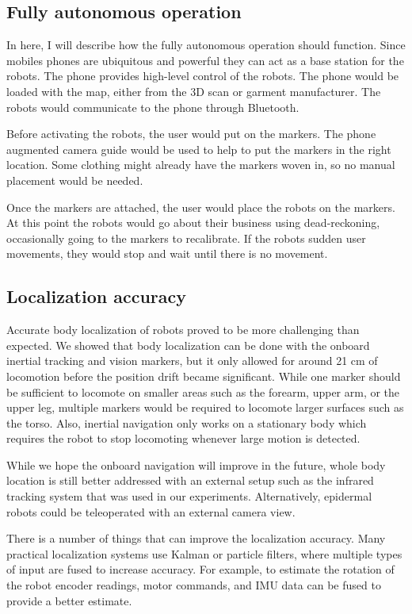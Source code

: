 \subsection{Fully autonomous operation}
In here, I will describe how the fully autonomous operation should function. 
Since mobiles phones are ubiquitous and powerful they can act as a base station for the robots. The phone provides high-level control of the robots. The phone would be loaded with the map, either from the 3D scan or garment manufacturer.  The robots would communicate to the phone through Bluetooth. 

Before activating the robots, the user would put on the markers. The phone augmented camera guide would be used to help to put the markers in the right location. Some clothing might already have the markers woven in, so no manual placement would be needed. 

Once the markers are attached, the user would place the robots on the markers. At this point the robots would go about their business using dead-reckoning, occasionally going to the markers to recalibrate. If the robots sudden user movements, they would stop and wait until there is no movement. 

\subsection{Localization accuracy}
Accurate body localization of robots proved to be more challenging than expected. We showed that body localization can be done with the onboard inertial tracking and vision markers, but it only allowed for around 21 cm of locomotion before the position drift became significant. While one marker should be sufficient to locomote on smaller areas such as the forearm, upper arm, or the upper leg, multiple markers would be required to locomote larger surfaces such as the torso. Also, inertial navigation only works on a stationary body which requires the robot to stop locomoting whenever large motion is detected.

While we hope the onboard navigation will improve in the future, whole body location is still better addressed with an external setup such as the infrared tracking system that was used in our experiments. Alternatively, epidermal robots could be teleoperated with an external camera view.    

There is a number of things that can improve the localization accuracy. Many practical localization systems use Kalman or particle filters, where multiple types of input are fused to increase accuracy. For example, to estimate the rotation of the robot encoder readings, motor commands, and IMU data can be fused to provide a better estimate. 

